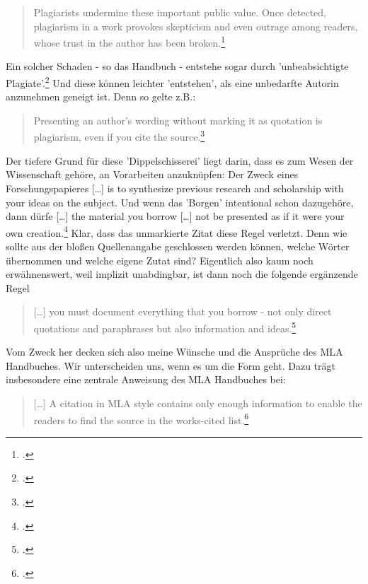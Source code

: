 \begin{quote} \glqq{}Plagiarists undermine these important public value. Once detected, plagiarism in a work provokes skepticism and even outrage among readers, whose trust in the author has been broken.\grqq{}\footcite[][52f]{ModLanAss2009a} \end{quote}

Ein solcher Schaden - so das Handbuch - entstehe sogar durch 'unbeabsichtigte Plagiate'.\footcite[vgl.][55 - im Original \glqq{}unintenional plagiarism\grqq{}]{ModLanAss2009a} Und diese können leichter 'entstehen', als eine unbedarfte Autorin anzunehmen geneigt ist. Denn so gelte z.B.:

\begin{quote}\glqq{}Presenting an author's wording without marking it as quotation is plagiarism, even if you cite the source.\grqq{}\footcite[][55 (herv.KR.)]{ModLanAss2009a} \end{quote}

Der tiefere Grund für diese 'Dippelschisserei' liegt darin, dass es zum Wesen der Wissenschaft gehöre, an Vorarbeiten anzuknüpfen: Der Zweck eines Forschungspapieres \glqq{}[\ldots] is to synthesize previous research and scholarship with your ideas on the subject\grqq{}. Und wenn das 'Borgen' intentional schon dazugehöre, dann dürfe \glqq{}[\ldots] the material you borrow [\ldots] not be presented as if it were your own creation\grqq{}.\footcite[vgl.][55]{ModLanAss2009a} Klar, dass das unmarkierte Zitat diese Regel verletzt. Denn wie sollte aus der bloßen Quellenangabe geschlossen werden können, welche Wörter übernommen und welche eigene Zutat sind? Eigentlich also kaum noch erwähnenswert, weil implizit unabdingbar, ist dann noch die folgende ergänzende Regel

\begin{quote} \glqq{}[\ldots] you must document everything that you borrow - not only direct quotations and paraphrases but also information and ideas.\grqq{}\footcite[][52f]{ModLanAss2009a} \end{quote}

Vom Zweck her decken sich also meine Wünsche und die Ansprüche des MLA Handbuches. Wir unterscheiden uns, wenn es um die Form geht. Dazu trägt insbesondere eine zentrale Anweisung des MLA Handbuches bei:

\begin{quote} \glqq{}[\ldots] A citation in MLA style contains only enough information to enable the readers to find the source in the works-cited list.\grqq{}\footcite[][127]{ModLanAss2009a} \end{quote}

